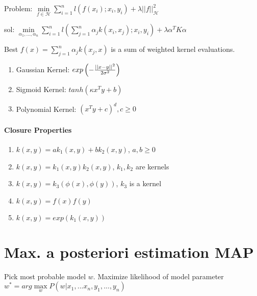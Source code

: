 \documentclass[11pt,twocolumn]{article}
\begin{document}
Problem: $\min \limits_{f \in \mathcal{H}} \sum \limits_{i=1}^n l(f(x_i);x_i, y_i) + \lambda || f||_{\mathcal{H}}^2$

sol: $\min \limits_{\alpha_1,...,\alpha_n} \sum \limits_{i=1}^n l \left( \sum \limits_{j=1}^n \alpha_j k(x_i, x_j);x_i,y_i  \right) + \lambda \alpha^T K \alpha$

Best $f(x) = \sum \limits_{j=1}^n \alpha_j k(x_j, x)$ is a sum of weighted kernel evaluations.


\begin{enumerate}[noitemsep]

\item Gaussian Kernel: $exp\left( - {{||x-y||^2}\over{2 \sigma^2}} \right)$ 

\item Sigmoid Kernel: $tanh(\kappa x^T y + b)$

\item Polynomial Kernel: $\left( x^Ty + c \right)^d, c \geq 0$

\end{enumerate}

\paragraph{Closure Properties}

\begin{enumerate}
\item $k(x,y) = a k_1(x,y) + b k_2(x,y)$, $a,b \geq 0$
\item $k(x,y) =  k_1(x,y)  k_2(x,y)$, $k_1, k_2$ are kernels
\item $k(x,y) =  k_3(\phi(x),  \phi(y))$, $k_3$ is a kernel
\item $k(x,y) =  f(x) f(y)$
\item $k(x,y) =  exp(k_1(x,y))$
\end{enumerate}


\section{Max. a posteriori estimation MAP}
Pick most probable model $w$. Maximize likelihood of model parameter $w^* = arg \max \limits_w P(w|x_1,...x_n,y_1,...,y_n) $ 
\end{document}
